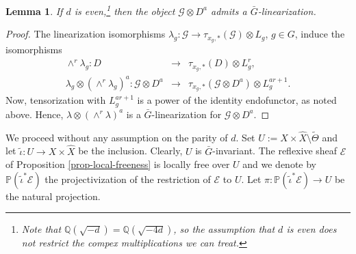 \documentclass[12pt]{amsart}
\numberwithin{equation}{subsection}
\theoremstyle{plain}
\newtheorem{lem}[thm]{Lemma}
\theoremstyle{definition}
\newcommand{\E}{{\mathcal E}}
\newcommand{\G}{{\mathcal G}}
\newcommand{\QQ}{{\mathbb Q}}
\newcommand{\PP}{{\mathbb P}}
\newcommand{\StructureSheaf}[1]{{\mathcal O}_{#1}}
\begin{document}
\begin{lem}
\label{lemma-if-d-is-even-E-descends}
If $d$ is even,\footnote{Note that $\QQ(\sqrt{-d})=\QQ(\sqrt{-4d})$, so the assumption that $d$ is even does not restrict the compex multiplications we can treat.} then the object $\G\otimes D^a$ admits a $\bar{G}$-linearization.
\end{lem}

\begin{proof}
The linearization isomorphisms $\lambda_g:\G\rightarrow \tau_{x_g,*}(\G)\otimes L_g$, $g\in G$,
induce the isomorphisms
\begin{eqnarray*}
\wedge^r\lambda_g:D&\rightarrow & \tau_{x_g,*}(D)\otimes L_g^r,
\\
\lambda_g\otimes (\wedge^r \lambda_g)^a : \G\otimes D^a
&\rightarrow & \tau_{x_g,*}(\G\otimes D^a)\otimes L_g^{ar+1}.
\end{eqnarray*}
Now, tensorization with $L_g^{ar+1}$ is a power of the identity endofunctor,
as noted above. Hence, $\lambda\otimes (\wedge^r\lambda)^a$ is a $\bar{G}$-linearization for $\G\otimes D^a$.
\end{proof}

We proceed without any assumption on the parity of $d$. Set $U:=X\times\hat{X}\setminus \tilde{\Theta}$ and let $\tilde{\iota}:U\rightarrow X\times\hat{X}$ be the inclusion. 
Clearly, $U$ is $\bar{G}$-invariant. The reflexive sheaf $\E$ of Proposition \ref{prop-local-freeness}
is locally free over $U$ and we denote by $\PP(\tilde{\iota}^*\E)$ the projectivization of the restriction of $\E$ to $U$. 
Let $\pi:\PP(\tilde{\iota}^*\E)\rightarrow U$ be the natural projection. 
\end{document}
